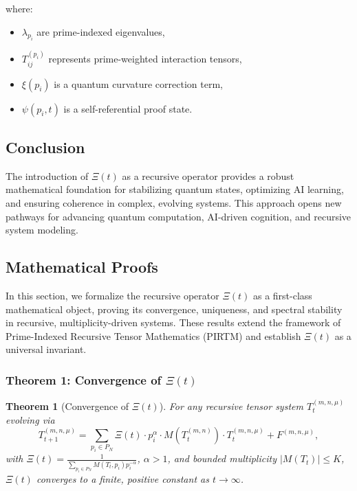 \documentclass{article}
\theoremstyle{plain}
\newtheorem{theorem}{Theorem}
\begin{document}
where:
\begin{itemize}
    \item \(\lambda_{p_i}\) are prime-indexed eigenvalues,
    \item \(T_{ij}^{(p_i)}\) represents prime-weighted interaction tensors,
    \item \(\xi(p_i)\) is a quantum curvature correction term,
    \item \(\psi(p_i, t)\) is a self-referential proof state.
\end{itemize}

\subsection{Conclusion}
The introduction of \(\Xi(t)\) as a recursive operator provides a robust mathematical foundation for stabilizing quantum states, optimizing AI learning, and ensuring coherence in complex, evolving systems. This approach opens new pathways for advancing quantum computation, AI-driven cognition, and recursive system modeling.

\subsection{Mathematical Proofs}
In this section, we formalize the recursive operator \(\Xi(t)\) as a first-class mathematical object, proving its convergence, uniqueness, and spectral stability in recursive, multiplicity-driven systems. These results extend the framework of Prime-Indexed Recursive Tensor Mathematics (PIRTM) and establish \(\Xi(t)\) as a universal invariant.

\subsubsection{Theorem 1: Convergence of \(\Xi(t)\)}
\begin{theorem}[Convergence of \(\Xi(t)\)]
For any recursive tensor system \( T_t^{(m, n, \mu)} \) evolving via
\[
T_{t+1}^{(m, n, \mu)} = \sum_{p_i \in P_N} \Xi(t) \cdot p_i^\alpha \cdot M(T_t^{(m, n)}) \cdot T_t^{(m, n, \mu)} + F^{(m, n, \mu)},
\]
with \(\Xi(t) = \frac{1}{\sum_{p_i \in P_N} M(T_t, p_i) p_i^{-\alpha}}\), \(\alpha > 1\), and bounded multiplicity \( |M(T_t)| \leq K \), \(\Xi(t)\) converges to a finite, positive constant as \( t \to \infty \).
\end{theorem}
\end{document}
